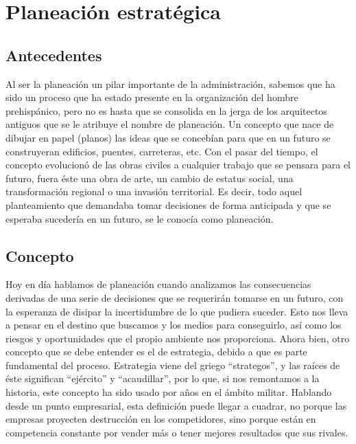 \section{Planeación estratégica}
\subsection{Antecedentes}
Al ser la planeación un pilar importante de la administración, sabemos que ha sido un proceso que ha estado presente en la organización del hombre prehispánico, pero no es hasta que se consolida en la jerga de los arquitectos antiguos que se le atribuye el nombre de planeación. Un concepto que nace de dibujar en papel (planos) las ideas que se concebían para que en un futuro se construyeran edificios, puentes, carreteras, etc. Con el pasar del tiempo, el concepto evolucionó de las obras civiles a cualquier trabajo que se pensara para el futuro, fuera éste una obra de arte, un cambio de estatus social, una transformación regional o una invasión territorial. Es decir, todo aquel planteamiento que demandaba tomar decisiones de forma anticipada y que se esperaba sucedería en un futuro, se le conocía como planeación. 


\subsection{Concepto}
Hoy en día hablamos de planeación cuando analizamos las consecuencias derivadas de una serie de decisiones que se requerirán tomarse en un futuro, con la esperanza de disipar la incertidumbre de lo que pudiera suceder. Esto nos lleva a pensar en el destino que buscamos y los medios para conseguirlo, así como los riesgos y oportunidades que el propio ambiente nos proporciona.
Ahora bien, otro concepto que se debe entender es el de estrategia, debido a que es parte fundamental del proceso. Estrategia viene del griego “strategos”, y las raíces de éste significan “ejército” y “acaudillar”, por lo que, si nos remontamos a la historia, este concepto ha sido usado por años en el ámbito militar. Hablando desde un punto empresarial, esta definición puede llegar a cuadrar, no porque las empresas proyecten destrucción en los competidores, sino porque están en competencia constante por vender más o tener mejores resultados que sus rivales.

